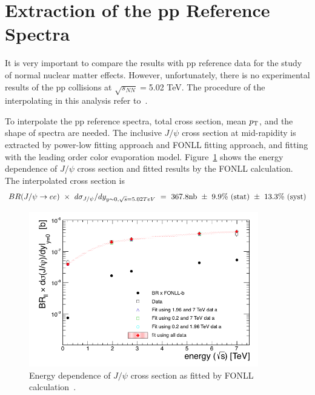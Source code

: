 \clearpage

\section{Extraction of the pp Reference Spectra}
\label{sec_4_ppref}
It is very important to compare the results with pp reference data for the study of normal nuclear matter effects. 
However, unfortunately, there is no experimental results of the pp collisions at $\sqrt{s_{NN}} =$5.02 TeV.
The procedure of the interpolating in this analysis refer to~\cite{bib_jpsippref}.

To interpolate the pp reference spectra, total cross section, mean $p_{\rm{T}}$, and the shape of spectra are needed. 
The inclusive $J/\psi$ cross section at mid-rapidity is extracted by power-low fitting approach and FONLL fitting approach, and fitting with the leading order color evaporation model.  
Figure~\ref{fig_4_ppsigmafit} shows the energy dependence of $J/\psi$ cross section and fitted results by the FONLL calculation. 
The interpolated cross section is
\begin{equation}
  BR(J/\psi\rightarrow ee)~\times ~d\sigma_{J/\psi}/dy_{y\sim0, \sqrt{s}=5.02TeV}~=~367.8 \rm{nb}~\pm~9.9\%~(stat)~\pm~ 13.3\% ~(syst)
\end{equation}  
\begin{figure}[!h]
  \centering
  \includegraphics[width=10cm]{chap4/figure/ppref/sigmafitfonll.png}
  \caption{
  	Energy dependence of $J/\psi$ cross section as fitted by FONLL calculation~\cite{bib_jpsippref}. 
  }
  \label{fig_4_ppsigmafit}
\end{figure}

